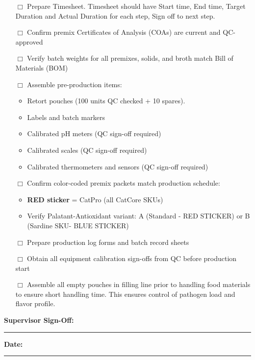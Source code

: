 \begin{itemize}[leftmargin=1.5em]
\item[$\Box$] Prepare Timesheet.
Timesheet should have Start time, End time, Target Duration and Actual Duration for each step, Sign off to next step.
\item[$\Box$] Confirm premix Certificates of Analysis (COAs) are current and QC-approved
\item[$\Box$] Verify batch weights for all premixes, solids, and broth match Bill of Materials (BOM)
\item[$\Box$] Assemble pre-production items:
  \begin{itemize}
  \item Retort pouches (100 units QC checked + 10 spares).
\item Labels and batch markers
  \item Calibrated pH meters (QC sign-off required)
  \item Calibrated scales (QC sign-off required)
  \item Calibrated thermometers and sensors (QC sign-off required)
  \end{itemize}
\item[$\Box$] Confirm color-coded premix packets match production schedule:
  \begin{itemize}
  \item \textbf{RED sticker} = CatPro (all CatCore SKUs)
  \item Verify Palatant-Antioxidant variant: A (Standard - RED STICKER) or B (Sardine SKU- BLUE STICKER)
  \end{itemize}
\item[$\Box$] Prepare production log forms and batch record sheets
\item[$\Box$] Obtain all equipment calibration sign-offs from QC before production start
\item[$\Box$] Assemble all empty pouches in filling line prior to handling food materials to ensure short 
handling time. This ensures control of pathogen load and flavor profile.
\end{itemize}

\vspace{1em}
\noindent\textbf{Supervisor Sign-Off:} \rule{5cm}{0.4pt} \hspace{1cm} \textbf{Date:} \rule{3cm}{0.4pt}

